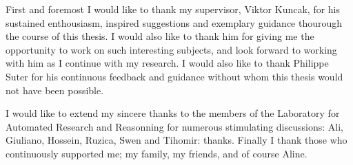 First and foremost I would like to thank my supervisor, Viktor Kuncak, for his
sustained enthousiasm, inspired suggestions and exemplary guidance thourough
the course of this thesis. I would also like to thank him for giving me the
opportunity to work on such interesting subjects, and look forward to working
with him as I continue with my research. I would also like to thank Philippe
Suter for his continuous feedback and guidance without whom this thesis would
not have been possible.

I would like to extend my sincere thanks to the members of the Laboratory for
Automated Research and Reasonning for numerous stimulating discussions: Ali,
Giuliano, Hossein, Ruzica, Swen and Tihomir: thanks. Finally I thank those who
continuously supported me; my family, my friends, and of course Aline.

